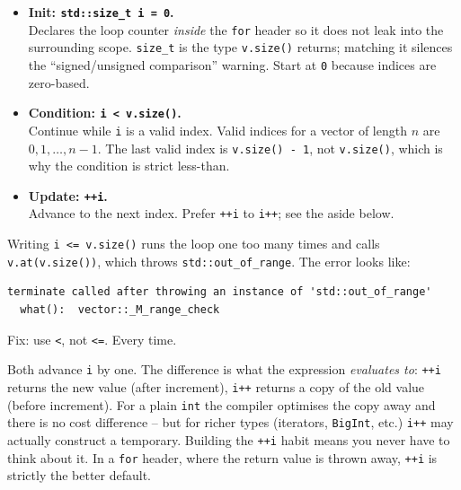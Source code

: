\documentclass[11pt]{article}
\begin{document}
\begin{itemize}
    \item \textbf{Init: \texttt{std::size\_t i = 0}.}\\
          Declares the loop counter \emph{inside} the \texttt{for}
          header so it does not leak into the surrounding scope.
          \texttt{size\_t} is the type \texttt{v.size()} returns;
          matching it silences the ``signed/unsigned comparison''
          warning. Start at \texttt{0} because indices are zero-based.

    \item \textbf{Condition: \texttt{i < v.size()}.}\\
          Continue while \texttt{i} is a valid index. Valid indices
          for a vector of length $n$ are $0, 1, \ldots, n{-}1$. The
          last valid index is \texttt{v.size() - 1}, not
          \texttt{v.size()}, which is why the condition is strict
          less-than.

    \item \textbf{Update: \texttt{++i}.}\\
          Advance to the next index. Prefer \texttt{++i} to
          \texttt{i++}; see the aside below.
\end{itemize}

\begin{warnbox}[\texttt{<} vs.\ \texttt{<=}]
Writing \texttt{i <= v.size()} runs the loop one too many times and
calls \texttt{v.at(v.size())}, which throws
\texttt{std::out\_of\_range}. The error looks like:
\begin{lstlisting}
terminate called after throwing an instance of 'std::out_of_range'
  what():  vector::_M_range_check
\end{lstlisting}
Fix: use \texttt{<}, not \texttt{<=}. Every time.
\end{warnbox}

\begin{notebox}
Both advance \texttt{i} by one. The difference is what the expression
\emph{evaluates to}: \texttt{++i} returns the new value (after
increment), \texttt{i++} returns a copy of the old value (before
increment). For a plain \texttt{int} the compiler optimises the
copy away and there is no cost difference -- but for richer types
(iterators, \texttt{BigInt}, etc.) \texttt{i++} may actually construct
a temporary. Building the \texttt{++i} habit means you never have to
think about it. In a \texttt{for} header, where the return value is
thrown away, \texttt{++i} is strictly the better default.
\end{notebox}
\end{document}

